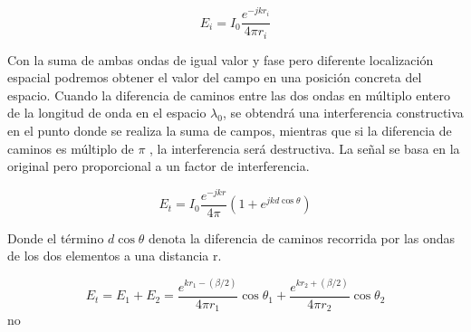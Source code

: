 \begin{equation}
	E_{i}=I_{0}\frac{e^{-jkr_{i}}}{4\pi r_{i}}
	\label{eq:ei}
\end{equation}


\par Con la suma de ambas ondas de igual valor y fase pero diferente localización espacial podremos obtener el valor del campo en una posición concreta del espacio. Cuando la diferencia de caminos entre las dos ondas en múltiplo entero de la longitud de onda en el espacio \textit{$\lambda _{0}$}, se obtendrá una interferencia constructiva en el punto donde se realiza la suma de campos, mientras que si la diferencia de caminos es múltiplo de $\pi$ , la interferencia será destructiva. La señal se basa en la original pero proporcional a un factor de interferencia.

\begin{equation}
	E_{t}=I_{0}\frac{e^{-jkr}}{4\pi}(1+e^{jkd\cos\theta })
	\label{eq:einter}
\end{equation}

Donde el término $d\cos\theta$ denota la diferencia de caminos recorrida por las ondas de los dos elementos a una distancia r.

\begin{equation}
	E_{t}=E_{1}+E_{2}=\frac{    e^{kr_{1}-(\beta/2)} }{ 4\pi r_{1}  }\cos\theta _{1}+\frac{    e^{kr_{2}+(\beta/2)} }{ 4\pi r_{2}  }\cos\theta _{2}
	\label{eq:ei}
\end{equation}
no